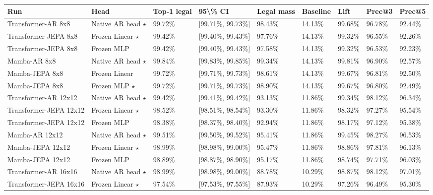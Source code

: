 
\begin{table}[t]
\centering
\small
\begin{tabular}{lllllllll}
\toprule
Run & Head & Top-1 legal & 95\textbackslash{}\% CI & Legal mass & Baseline & Lift & Prec@3 & Prec@5 \\
\midrule
Transformer-AR 8x8 & Native AR head $\star$ & 99.72\% & [99.71\%, 99.73\%] & 98.43\% & 14.13\% & 99.68\% & 96.78\% & 92.44\% \\
Transformer-JEPA 8x8 & Frozen Linear $\star$ & 99.42\% & [99.40\%, 99.43\%] & 97.76\% & 14.13\% & 99.32\% & 96.55\% & 92.26\% \\
Transformer-JEPA 8x8 & Frozen MLP & 99.42\% & [99.40\%, 99.43\%] & 97.58\% & 14.13\% & 99.32\% & 96.53\% & 92.23\% \\
Mamba-AR 8x8 & Native AR head $\star$ & 99.84\% & [99.83\%, 99.85\%] & 99.34\% & 14.13\% & 99.81\% & 96.90\% & 92.57\% \\
Mamba-JEPA 8x8 & Frozen Linear & 99.72\% & [99.71\%, 99.73\%] & 98.61\% & 14.13\% & 99.67\% & 96.81\% & 92.50\% \\
Mamba-JEPA 8x8 & Frozen MLP $\star$ & 99.72\% & [99.71\%, 99.73\%] & 98.90\% & 14.13\% & 99.67\% & 96.80\% & 92.49\% \\
Transformer-AR 12x12 & Native AR head $\star$ & 99.42\% & [99.41\%, 99.42\%] & 93.13\% & 11.86\% & 99.34\% & 98.12\% & 96.34\% \\
Transformer-JEPA 12x12 & Frozen Linear $\star$ & 98.52\% & [98.51\%, 98.54\%] & 93.30\% & 11.86\% & 98.32\% & 97.27\% & 95.54\% \\
Transformer-JEPA 12x12 & Frozen MLP & 98.38\% & [98.37\%, 98.40\%] & 92.94\% & 11.86\% & 98.17\% & 97.12\% & 95.38\% \\
Mamba-AR 12x12 & Native AR head $\star$ & 99.51\% & [99.50\%, 99.52\%] & 95.41\% & 11.86\% & 99.45\% & 98.27\% & 96.53\% \\
Mamba-JEPA 12x12 & Frozen Linear $\star$ & 98.99\% & [98.98\%, 99.00\%] & 95.47\% & 11.86\% & 98.86\% & 97.81\% & 96.13\% \\
Mamba-JEPA 12x12 & Frozen MLP & 98.89\% & [98.87\%, 98.90\%] & 95.17\% & 11.86\% & 98.74\% & 97.71\% & 96.03\% \\
Transformer-AR 16x16 & Native AR head $\star$ & 98.99\% & [98.98\%, 99.00\%] & 88.78\% & 10.29\% & 98.87\% & 98.12\% & 97.01\% \\
Transformer-JEPA 16x16 & Frozen Linear $\star$ & 97.54\% & [97.53\%, 97.55\%] & 87.93\% & 10.29\% & 97.26\% & 96.49\% & 95.30\% \\

\end{tabular}
\end{table}
